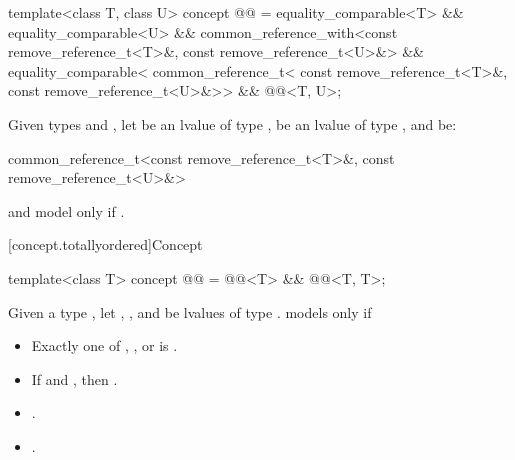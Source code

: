 \begin{itemdecl}
template<class T, class U>
  concept @@ =
    equality_comparable<T> && equality_comparable<U> &&
    common_reference_with<const remove_reference_t<T>&, const remove_reference_t<U>&> &&
    equality_comparable<
      common_reference_t<
        const remove_reference_t<T>&,
        const remove_reference_t<U>&>> &&
    @@<T, U>;
\end{itemdecl}

\begin{itemdescr}
\pnum
Given types  and ,
let  be an lvalue of type ,
 be an lvalue of type ,
and  be:
\begin{codeblock}
common_reference_t<const remove_reference_t<T>&, const remove_reference_t<U>&>
\end{codeblock}
 and  model
 only if
.
\end{itemdescr}

[concept.totallyordered]{Concept }

\begin{itemdecl}
template<class T>
  concept @@ =
    @@<T> && @@<T, T>;
\end{itemdecl}

\begin{itemdescr}
\pnum
Given a type , let , , and  be
lvalues of type .
 models  only if

\begin{itemize}
\item Exactly one of , , or
       is .
\item If  and , then
      .
\item {}.
\item {}.
\end{itemize}

\end{itemdescr}

